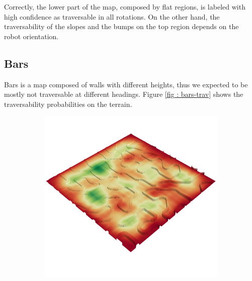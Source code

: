 \documentclass[../document.tex]{subfiles}
\begin{document}
 Correctly, the lower part of the map, composed by flat regions, is labeled with high confidence as traversable in all rotations. On the other hand, the traversability of the slopes and the bumps on the top region depends on the robot orientation.

\subsection{Bars}
Bars is a map composed of walls with different heights, thus we expected to be mostly not traversable at different headings. Figure \ref{fig : bars-trav} shows the traversability probabilities on the terrain.

\begin{figure} [htbp]
  \centering
  \begin{subfigure}[b]{0.45\textwidth}
    \includegraphics[width=\linewidth]{../img/4/traversability/bars/-270.png} 
  \end{subfigure}
  \begin{subfigure}[b]{0.45\textwidth}

\end{subfigure}
\end{figure}
\end{document}

